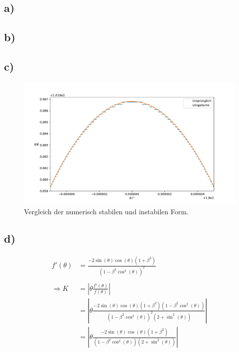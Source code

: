 \documentclass[a4paper, 11pt]{article}
\begin{document}
\subsection*{a)}
\subsection*{b)}
\subsection*{c)}
\begin{figure}
    \centering
    \includegraphics[width=\textwidth]{../A04/A4_stab.pdf}
    \caption{Vergleich der numerisch stabilen und instabilen Form.}
    \label{fig:4c}
\end{figure}
\subsection*{d)}
\begin{equation}
    \begin{split}
        f'\left(\theta\right) &= \frac{-2 \sin\left(\theta\right)\cos\left(\theta\right) \left(1+\beta^2\right)}{\left(1-\beta^2 \cos^2\left(\theta\right)\right)^2} \\
        \\
        \Rightarrow K &= \left| \theta  \frac{f'\left(\theta\right)}{f\left(\theta\right)}\right| \\
        &= \left| \theta  \frac{-2 \sin\left(\theta\right)\cos\left(\theta\right)\left(1+\beta^2\right)\left(1-\beta^2 \cos^2\left(\theta\right)\right)}
        {\left(1-\beta^2 \cos^2\left(\theta\right)\right)^2 \left(2+\sin^2\left(\theta\right)\right)} \right| \\
        &= \left| \theta  \frac{-2 \sin\left(\theta\right)\cos\left(\theta\right)\left(1+\beta^2\right)}{\left(1-\beta^2 \cos^2\left(\theta\right)\right) \left(2+\sin^2\left(\theta\right)\right)}\right|
    \end{split}
    \label{eqn:K}
\end{equation}
\end{document}
